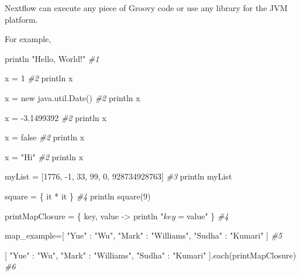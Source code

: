 \documentclass[
]{book}
\newenvironment{Shaded}{\begin{snugshade}}{\end{snugshade}}
\newcommand{\CommentTok}[1]{\textcolor[rgb]{0.56,0.35,0.01}{\textit{#1}}}
\newcommand{\DecValTok}[1]{\textcolor[rgb]{0.00,0.00,0.81}{#1}}
\newcommand{\FloatTok}[1]{\textcolor[rgb]{0.00,0.00,0.81}{#1}}
\newcommand{\FunctionTok}[1]{\textcolor[rgb]{0.00,0.00,0.00}{#1}}
\newcommand{\NormalTok}[1]{#1}
\newcommand{\OtherTok}[1]{\textcolor[rgb]{0.56,0.35,0.01}{#1}}
\newcommand{\SpecialCharTok}[1]{\textcolor[rgb]{0.00,0.00,0.00}{#1}}
\newcommand{\StringTok}[1]{\textcolor[rgb]{0.31,0.60,0.02}{#1}}
\begin{document}
Nextflow can execute any piece of Groovy code or use any library for the JVM platform.

For example,

\begin{Shaded}
\begin{Highlighting}[numbers=left,,]
\NormalTok{println }\StringTok{"Hello, World!"} \CommentTok{\#1}
 
\NormalTok{x }\OtherTok{=} \DecValTok{1} \CommentTok{\#2}
\NormalTok{println x}
 
\NormalTok{x }\OtherTok{=}\NormalTok{ new }\FunctionTok{java.util.Date}\NormalTok{() }\CommentTok{\#2}
\NormalTok{println x}
 
\NormalTok{x }\OtherTok{=} \SpecialCharTok{{-}}\FloatTok{3.1499392} \CommentTok{\#2}
\NormalTok{println x}
 
\NormalTok{x }\OtherTok{=}\NormalTok{ false }\CommentTok{\#2}
\NormalTok{println x}
 
\NormalTok{x }\OtherTok{=} \StringTok{"Hi"} \CommentTok{\#2}
\NormalTok{println x}

\NormalTok{myList }\OtherTok{=}\NormalTok{ [}\DecValTok{1776}\NormalTok{, }\SpecialCharTok{{-}}\DecValTok{1}\NormalTok{, }\DecValTok{33}\NormalTok{, }\DecValTok{99}\NormalTok{, }\DecValTok{0}\NormalTok{, }\DecValTok{928734928763}\NormalTok{] }\CommentTok{\#3}
\NormalTok{println myList}

\NormalTok{square }\OtherTok{=}\NormalTok{ \{ it }\SpecialCharTok{*}\NormalTok{ it \} }\CommentTok{\#4}
\NormalTok{println }\FunctionTok{square}\NormalTok{(}\DecValTok{9}\NormalTok{)}
 
\NormalTok{printMapClosure }\OtherTok{=}\NormalTok{ \{ key, value }\OtherTok{{-}\textgreater{}}
\NormalTok{   println }\StringTok{"$key = $value"}
\NormalTok{\} }\CommentTok{\#4}

\NormalTok{map\_example}\OtherTok{=}\NormalTok{[ }\StringTok{"Yue"} \SpecialCharTok{:} \StringTok{"Wu"}\NormalTok{, }\StringTok{"Mark"} \SpecialCharTok{:} \StringTok{"Williams"}\NormalTok{, }\StringTok{"Sudha"} \SpecialCharTok{:} \StringTok{"Kumari"}\NormalTok{ ] }\CommentTok{\#5}


\NormalTok{[ }\StringTok{"Yue"} \SpecialCharTok{:} \StringTok{"Wu"}\NormalTok{, }\StringTok{"Mark"} \SpecialCharTok{:} \StringTok{"Williams"}\NormalTok{, }\StringTok{"Sudha"} \SpecialCharTok{:} \StringTok{"Kumari"}\NormalTok{ ]}\FunctionTok{.each}\NormalTok{(printMapClosure) }\CommentTok{\#6}
\end{Highlighting}
\end{Shaded}
\end{document}

